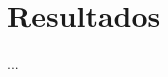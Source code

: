 \documentclass[IB,BIB]{TFUOC}%
\let\oldgls=\gls
\renewcommand{\gls}[1]{{\hypersetup{linkcolor=[RGB]{0,0,0}}
  \oldgls{#1}}}
\begin{document}
% 


\chapter{Resultados}
\label{chap:Resultados}



% 

...


\end{document}

